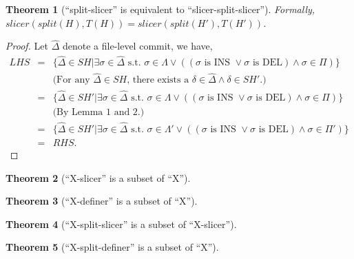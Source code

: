 \documentclass[11pt,letterpaper]{article}
\newtheorem{theorem}{Theorem}
\begin{document}
  \begin{theorem}[``split-slicer'' is equivalent to ``slicer-split-slicer'']
    Formally, $slicer(split(H), T(H)) = slicer(split(H'), T(H'))$.
  \end{theorem}
  \begin{proof}
    Let $\hat{\Delta}$ denote a file-level commit, we have,
    \[
    \begin{array}{rcl}
      LHS & = & \{\hat{\Delta} \in SH | \exists \sigma \in 
      \hat{\Delta}\text{ s.t. } \sigma \in \Lambda \vee ((\sigma\text{ is INS 
      }\vee \sigma\text{ is DEL}) \wedge \sigma \in \Pi)\} \\
          &   & \text{(For any $\hat{\Delta} \in SH$, there exists a $\delta 
          \in \hat{\Delta} \wedge \delta \in SH'$.)} \\
          & = & \{\hat{\Delta} \in SH' | \exists \sigma \in 
      \hat{\Delta}\text{ s.t. } \sigma \in \Lambda \vee ((\sigma\text{ is INS 
      }\vee \sigma\text{ is DEL}) \wedge \sigma \in \Pi)\} \\
          &   & \text{(By Lemma 1 and 2.)} \\
          & = & \{\hat{\Delta} \in SH' | \exists \sigma \in 
      \hat{\Delta}\text{ s.t. } \sigma \in \Lambda' \vee ((\sigma\text{ is INS 
      }\vee \sigma\text{ is DEL}) \wedge \sigma \in \Pi')\} \\
          & = & RHS.
    \end{array}
    \]
  \end{proof}

  \begin{theorem}[``X-slicer'' is a subset of ``X'']
  \end{theorem}
  
  \begin{theorem}[``X-definer'' is a subset of ``X'']
  \end{theorem}

  \begin{theorem}[``X-split-slicer'' is a subset of ``X-slicer'']
  \end{theorem}
  
  \begin{theorem}[``X-split-definer'' is a subset of ``X'']
  \end{theorem}
\end{document}
